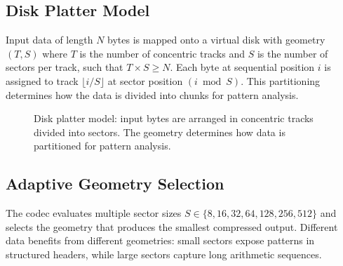 \documentclass[11pt,a4paper]{article}
\begin{document}
\subsection{Disk Platter Model}

Input data of length $N$ bytes is mapped onto a virtual disk with geometry $(T, S)$ where $T$ is the number of concentric tracks and $S$ is the number of sectors per track, such that $T \times S \geq N$. Each byte at sequential position $i$ is assigned to track $\lfloor i / S \rfloor$ at sector position $(i \bmod S)$. This partitioning determines how the data is divided into chunks for pattern analysis.

\begin{figure}[h]
\centering
{}
\caption{Disk platter model: input bytes are arranged in concentric tracks divided into sectors. The geometry determines how data is partitioned for pattern analysis.}
\end{figure}

\subsection{Adaptive Geometry Selection}

The codec evaluates multiple sector sizes $S \in \{8, 16, 32, 64, 128, 256, 512\}$ and selects the geometry that produces the smallest compressed output. Different data benefits from different geometries: small sectors expose patterns in structured headers, while large sectors capture long arithmetic sequences.
\end{document}
